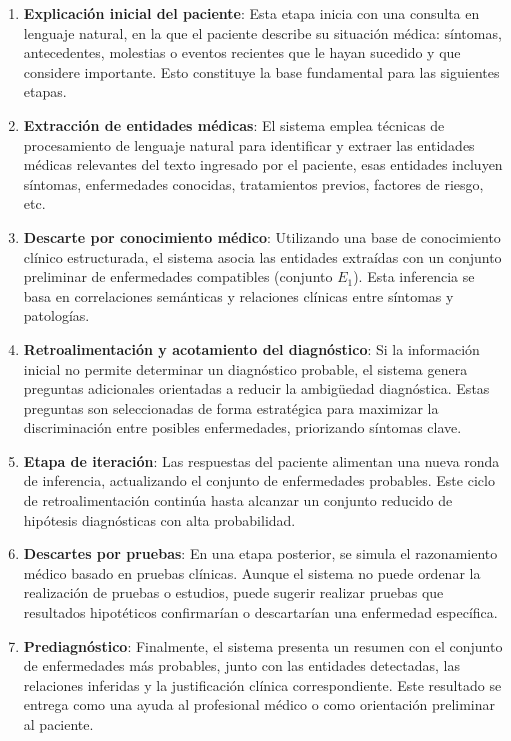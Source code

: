 \documentclass{llncs}
\begin{document}
\begin{enumerate}
  \item \textbf{Explicación inicial del paciente}: Esta etapa inicia con una consulta en lenguaje natural, en la que el paciente describe su situación médica: síntomas, antecedentes, molestias o eventos recientes
  que le hayan sucedido y que considere importante. Esto constituye la base fundamental para las siguientes etapas.
  \item \textbf{Extracción de entidades médicas}: El sistema emplea técnicas de procesamiento de lenguaje natural para identificar y extraer las entidades médicas relevantes del texto ingresado por 
  el paciente, esas entidades incluyen síntomas, enfermedades conocidas, tratamientos previos, factores de riesgo, etc.
  \item \textbf{Descarte por conocimiento médico}: Utilizando una base de conocimiento clínico estructurada, el sistema asocia las entidades extraídas con un conjunto preliminar de enfermedades compatibles (conjunto $E_1$).
  Esta inferencia se basa en correlaciones semánticas y relaciones clínicas entre síntomas y patologías.
  \item \textbf{Retroalimentación y acotamiento del diagnóstico}: Si la información inicial no permite determinar un diagnóstico probable, el sistema genera preguntas adicionales orientadas a reducir la ambigüedad diagnóstica.
  Estas preguntas son seleccionadas de forma estratégica para maximizar la discriminación entre posibles enfermedades, priorizando síntomas clave.
  \item \textbf{Etapa de iteración}: Las respuestas del paciente alimentan una nueva ronda de inferencia, actualizando el conjunto de enfermedades probables. Este ciclo de retroalimentación continúa hasta alcanzar un conjunto
  reducido de hipótesis diagnósticas con alta probabilidad.
  \item \textbf{Descartes por pruebas}: En una etapa posterior, se simula el razonamiento médico basado en pruebas clínicas. Aunque el sistema no puede ordenar la realización de pruebas o estudios, puede sugerir realizar pruebas
  que resultados hipotéticos confirmarían o descartarían una enfermedad específica.
  \item \textbf{Prediagnóstico}: Finalmente, el sistema presenta un resumen con el conjunto de enfermedades más probables, junto con las entidades detectadas, las relaciones inferidas y la justificación clínica correspondiente.
  Este resultado se entrega como una ayuda al profesional médico o como orientación preliminar al paciente.
\end{enumerate}
\end{document}
